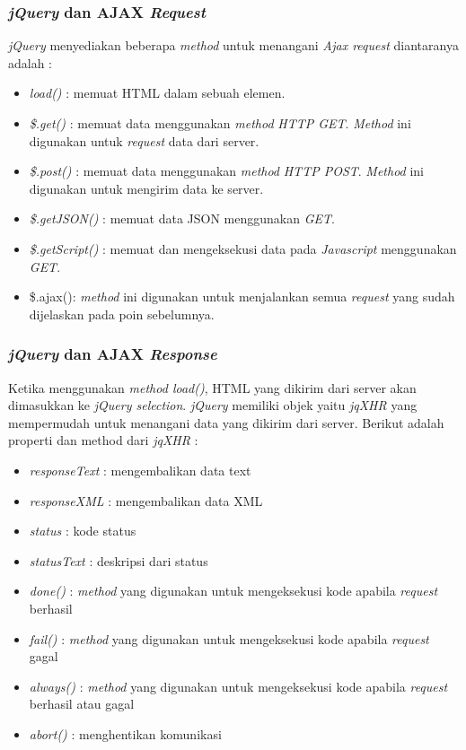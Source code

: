 \subsubsection{\textit{jQuery} dan AJAX \textit{Request}}
\textit{jQuery} menyediakan beberapa \textit{method} untuk menangani \textit{Ajax request} diantaranya adalah :

\begin{itemize}
	\item \textit{load()} : memuat HTML dalam sebuah elemen.
	\item \textit{\$.get()} : memuat data menggunakan \textit{method} \textit{HTTP GET}. \textit{Method} ini digunakan untuk \textit{request} data dari server.
	\item \textit{\$.post()} : memuat data menggunakan \textit{method} \textit{HTTP POST}. \textit{Method} ini digunakan untuk mengirim data ke server.
	\item \textit{\$.getJSON()} : memuat data JSON menggunakan \textit{GET}. 
	\item \textit{\$.getScript()} : memuat dan mengeksekusi data pada \textit{Javascript} menggunakan \textit{GET}.
	\item \$.ajax(): \textit{method} ini digunakan untuk menjalankan semua \textit{request} yang sudah dijelaskan pada poin sebelumnya. 
\end{itemize}

\subsubsection{\textit{jQuery} dan AJAX \textit{Response}}
Ketika menggunakan \textit{method load()}, HTML yang dikirim dari server akan dimasukkan ke \textit{jQuery selection}. \textit{jQuery} memiliki objek yaitu \textit{jqXHR} yang mempermudah untuk menangani data yang dikirim dari server. Berikut adalah properti dan method dari \textit{jqXHR} :

\begin{itemize}
	\item \textit{responseText} : mengembalikan data text
	\item \textit{responseXML} : mengembalikan data XML
	\item \textit{status} : kode status
	\item \textit{statusText} : deskripsi dari status
	\item \textit{done()} : \textit{method} yang digunakan untuk mengeksekusi kode apabila \textit{request} berhasil
	\item \textit{fail()} : \textit{method} yang digunakan untuk mengeksekusi kode apabila \textit{request} gagal
	\item \textit{always()} : \textit{method} yang digunakan untuk mengeksekusi kode apabila \textit{request} berhasil atau gagal
	\item \textit{abort()} : menghentikan komunikasi
\end{itemize} 


